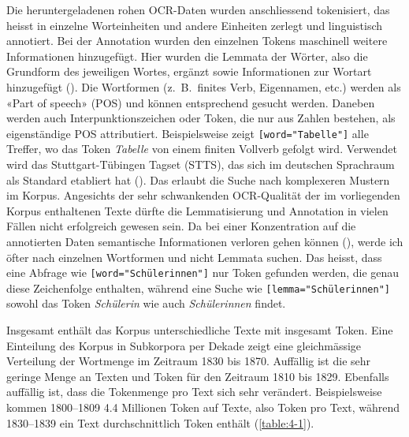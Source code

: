 Die heruntergeladenen rohen OCR-Daten wurden anschliessend tokenisiert, das heisst in einzelne Worteinheiten und andere Einheiten zerlegt und linguistisch annotiert. Bei der Annotation wurden den einzelnen Tokens maschinell weitere Informationen hinzugefügt. Hier wurden die Lemmata der Wörter, also die Grundform des jeweiligen Wortes, ergänzt sowie Informationen zur Wortart hinzugefügt (\cite[57-87]{lemnitzer_korpuslinguistik_2015}). Die Wortformen (z.~B.~finites Verb, Eigennamen, etc.) werden als «Part of speech» (POS) und können entsprechend gesucht werden. Daneben werden auch Interpunktionszeichen oder Token, die nur aus Zahlen bestehen, als eigenständige POS attributiert. Beispielsweise zeigt \texttt{[word="Ta\-belle"]\-[pos="VVFIN"]} alle Treffer, wo das Token \textit{Tabelle} von einem finiten Vollverb gefolgt wird. Verwendet wird das Stuttgart-Tübingen Tagset (STTS), das sich im deutschen Sprachraum als Standard etabliert hat (\cite{schiller_guidelines_1999}). Das erlaubt die Suche nach komplexeren Mustern im Korpus. Angesichts der sehr schwankenden OCR-Qualität der im vorliegenden Korpus enthaltenen Texte dürfte die Lemmatisierung und Annotation in vielen Fällen nicht erfolgreich gewesen sein. Da bei einer Konzentration auf die annotierten Daten semantische Informationen verloren gehen können (\cite[124-127]{bubenhofer_sprachgebrauchsmuster_2009}), werde ich öfter nach einzelnen Wortformen und nicht Lemmata suchen. Das heisst, dass eine Abfrage wie \texttt{[word=\string"Schül\-er\-innen"]} nur Token gefunden werden, die genau diese Zeichenfolge enthalten, während eine Suche wie \texttt{[lemma\-=\string"Schüler\-innen"]} sowohl das Token \textit{Schül\-er\-in} wie auch \textit{Schülerinnen} findet.

Insgesamt enthält das Korpus  unterschiedliche Texte mit insgesamt  Token. Eine Einteilung des Korpus in Subkorpora per Dekade zeigt eine gleichmässige Verteilung der Wortmenge im Zeitraum 1830 bis 1870. Auffällig ist die sehr geringe Menge an Texten und Token für den Zeitraum 1810 bis 1829. Ebenfalls auffällig ist, dass die Tokenmenge pro Text sich sehr verändert. Beispielsweise kommen 1800–1809 4.4 Millionen Token auf  Texte, also  Token pro Text, während 1830–1839 ein Text durchschnittlich  Token enthält (\cref{table:4-1}). 

\hspace{1cm}

